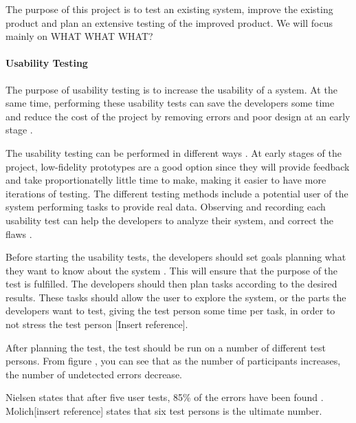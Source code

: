 The purpose of this project is to test an existing system, improve the existing product and plan an extensive testing of the improved product. We will focus mainly on WHAT WHAT WHAT?

\paragraph{Usability Testing}
The purpose of usability testing is to increase the usability of a system. At the same time, performing these usability tests can save the developers some time and reduce the cost of the project by removing errors and poor design at an early stage \cite{dumas1995practical}.

The usability testing can be performed in different ways \cite{schneidermanusercentered}. At early stages of the project, low-fidelity prototypes are a good option since they will provide feedback and take proportionatelly little time to make, making it easier to have more iterations of testing. The different testing methods include a potential user of the system performing tasks to provide real data. Observing and recording each usability test can help the developers to analyze their system, and correct the flaws \cite{dumas1995practical}. 

Before starting the usability tests, the developers should set goals planning what they want to know about the system \cite{isosoftwareengineering}. This will ensure that the purpose of the test is fulfilled. The developers should then plan tasks according to the desired results. These tasks should allow the user to explore the system, or the parts the developers want to test, giving the test person some time per task, in order to not stress the test person [Insert reference]. 

After planning the test, the test should be run on a number of different test persons. From figure %
, you can see that as the number of participants increases, the number of undetected errors decrease. 


Nielsen states that after five user tests, 85\% of the errors have been found \cite{nielsennumberoftests}. Molich[insert reference] states that six test persons is the ultimate number. 

